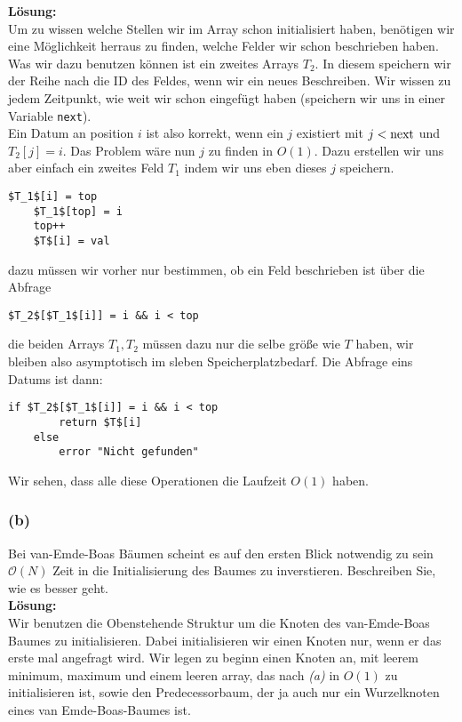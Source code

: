 \documentclass[11pt,a4paper,ngerman]{article}
\begin{document}
\noindent\textbf{Lösung:}\\
Um zu wissen welche Stellen wir im Array schon initialisiert haben, benötigen wir eine Möglichkeit herraus zu finden, welche Felder wir schon beschrieben haben. Was wir dazu benutzen können ist ein zweites Arrays $T_2$. In diesem speichern wir der Reihe nach die ID des Feldes, wenn wir ein neues Beschreiben. Wir wissen zu jedem Zeitpunkt, wie weit wir schon eingefügt haben (speichern wir uns in einer Variable \lstinline|next|).\\

Ein Datum an position $i$ ist also korrekt, wenn ein $j$ existiert mit $j < \lstinline|next|$ und $T_2[j] = i$. Das Problem wäre nun $j$ zu finden in $O(1)$. Dazu erstellen wir uns aber einfach ein zweites Feld $T_1$ indem wir uns eben dieses $j$ speichern.\\

\begin{lstlisting}[label="Einfügen eines neuen Datums"]
	$T_1$[i] = top
	$T_1$[top] = i
	top++
	$T$[i] = val
\end{lstlisting}
dazu müssen wir vorher nur bestimmen, ob ein Feld beschrieben ist über die Abfrage
\begin{lstlisting}[label="Darum existiert"]
	$T_2$[$T_1$[i]] = i && i < top
\end{lstlisting}
die beiden Arrays $T_1, T_2$ müssen dazu nur die selbe größe wie $T$ haben, wir bleiben also asymptotisch im sleben Speicherplatzbedarf. Die
Abfrage eins Datums ist dann:
\begin{lstlisting}[label="Datum ermitteln"]
	if $T_2$[$T_1$[i]] = i && i < top
		return $T$[i]
	else
		error "Nicht gefunden"
\end{lstlisting}

Wir sehen, dass alle diese Operationen die Laufzeit $O(1)$ haben.
\subsubsection*{(b)}

Bei van-Emde-Boas  Bäumen scheint es auf den ersten Blick notwendig zu sein $\mathcal{O}(N)$ Zeit in die Initialisierung des Baumes zu inverstieren. Beschreiben Sie, wie es besser geht.\\

\noindent\textbf{Lösung:}\\

Wir benutzen die Obenstehende Struktur um die Knoten des van-Emde-Boas Baumes zu initialisieren. Dabei initialisieren wir einen Knoten nur,
wenn er das erste mal angefragt wird. Wir legen zu beginn einen Knoten an, mit leerem minimum, maximum und einem leeren array,
das nach \emph{(a)} in $O(1)$ zu initialisieren ist, sowie den Predecessorbaum, der ja auch nur ein Wurzelknoten eines van Emde-Boas-Baumes ist.
\end{document}
